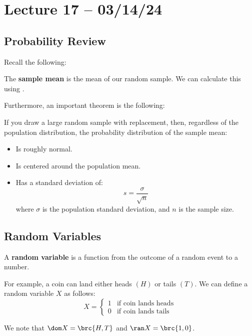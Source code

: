 \documentclass[openany]{book}
\begin{document}
\section{Lecture 17 -- 03/14/24}
\subsection{Probability Review}
Recall the following:
\begin{defn}
	The \textbf{sample mean} is the mean of our random sample. We can calculate this using .
\end{defn}

Furthermore, an important theorem is the following:
\begin{thm}
	If you draw a large random sample with replacement, then, regardless of the population distribution, the probability distribution of the sample mean:
	\begin{itemize}
		\item Is roughly normal.
		\item Is centered around the population mean.
		\item Has a standard deviation of:
		\begin{equation*}
			s = \dfrac{\sigma}{\sqrt{n}}
		\end{equation*}
		where $\sigma$ is the population standard deviation, and $n$ is the sample size.
	\end{itemize}
\end{thm}

\subsection{Random Variables}
\begin{defn}
	A \textbf{random variable} is a function from the outcome of a random event to a number.
\end{defn}
\begin{example}
	For example, a coin can land either heads $(H)$ or tails $(T)$. We can define a random variable $X$ as follows:
	\begin{equation*}
		X = \begin{cases}
				1 & \text{if coin lands heads} \\
				0 & \text{if coin lands tails}
			\end{cases}
	\end{equation*}

	We note that $\dom X = \brc{H, T}$ and $\ran X = \brc{1,0}$.
\end{example}
\end{document}
